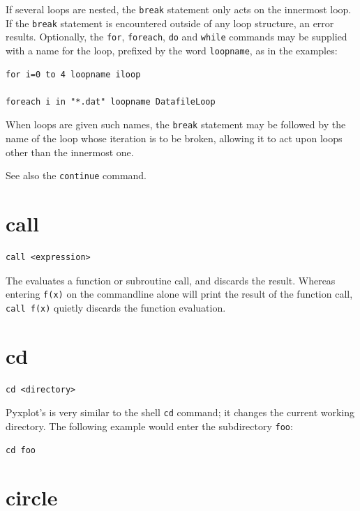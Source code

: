 If several loops are nested, the {\tt break} statement only acts on the
innermost loop. If the {\tt break} statement is encountered outside of any loop
structure, an error results. Optionally, the {\tt for}, {\tt foreach}, {\tt do}
and {\tt while} commands may be supplied with a name for the loop, prefixed by
the word {\tt loopname}, as in the examples:

\begin{verbatim}
for i=0 to 4 loopname iloop

foreach i in "*.dat" loopname DatafileLoop
\end{verbatim}

\noindent When loops are given such names, the {\tt break} statement may be
followed by the name of the loop whose iteration is to be broken, allowing it
to act upon loops other than the innermost one.

See also the {\tt continue} command.


\section{call}

\begin{verbatim}
call <expression>
\end{verbatim}

The  evaluates a function or subroutine call, and discards the
result. Whereas entering {\tt f(x)} on the commandline alone will print the
result of the function call, {\tt call f(x)} quietly discards the function
evaluation.

\section{cd}

\begin{verbatim}
cd <directory>
\end{verbatim}

Pyxplot's  is very similar to the shell {\tt cd} command; it
changes the current working directory. The following example would enter the
subdirectory {\tt foo}:

\begin{verbatim}
cd foo
\end{verbatim}


\section{circle}

